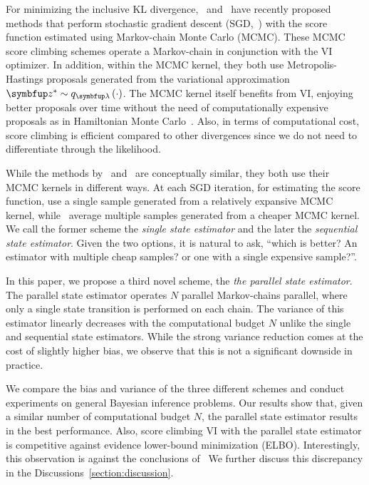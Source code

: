 For minimizing the inclusive KL divergence,~\citet{NEURIPS2020_b2070693} and~\citet{pmlr-v124-ou20a} have recently proposed  methods that perform stochastic gradient descent (SGD,~\citealt{robbins_stochastic_1951}) with the score function estimated using Markov-chain Monte Carlo (MCMC).
These MCMC score climbing schemes operate a Markov-chain in conjunction with the VI optimizer.
In addition, within the MCMC kernel, they both use Metropolis-Hastings proposals generated from the variational approximation \(\vz^* \sim q_{\vlambda}\left(\cdot\right)\).
The MCMC kernel itself benefits from VI, enjoying better proposals over time without the need of computationally expensive proposals as in Hamiltonian Monte Carlo~\citep{duane_hybrid_1987, neal_mcmc_2011, betancourt_conceptual_2017}.
Also, in terms of computational cost, score climbing is efficient compared to other divergences since we do not need to differentiate through the likelihood.

While the methods by~\citet{NEURIPS2020_b2070693} and~\citet{pmlr-v124-ou20a} are conceptually similar, they both use their MCMC kernels in different ways.
At each SGD iteration, for estimating the score function, \citeauthor{NEURIPS2020_b2070693} use a single sample generated from a relatively expansive MCMC kernel, while~\citeauthor{pmlr-v124-ou20a} average multiple samples generated from a cheaper MCMC kernel.
We call the former scheme the \textit{single state estimator} and the later the \textit{sequential state estimator}.
Given the two options, it is natural to ask, ``which is better? An estimator with multiple cheap samples? or one with a single expensive sample?''.

In this paper, we propose a third novel scheme, the \textit{the parallel state estimator}.
The parallel state estimator operates \(N\) parallel Markov-chains parallel, where only a single state transition is performed on each chain.
The variance of this estimator linearly decreases with the computational budget \(N\) unlike the single and sequential state estimators.
While the strong variance reduction comes at the cost of slightly higher bias, we observe that this is not a significant downside in practice.

We compare the bias and variance of the three different schemes and conduct experiments on general Bayesian inference problems.
Our results show that, given a similar number of computational budget \(N\), the parallel state estimator results in the best performance.
Also, score climbing VI with the parallel state estimator is competitive against evidence lower-bound minimization (ELBO).
Interestingly, this observation is against the conclusions of~\cite{dhaka_challenges_2021}
We further discuss this discrepancy in the Discussions~\cref{section:discussion}.


